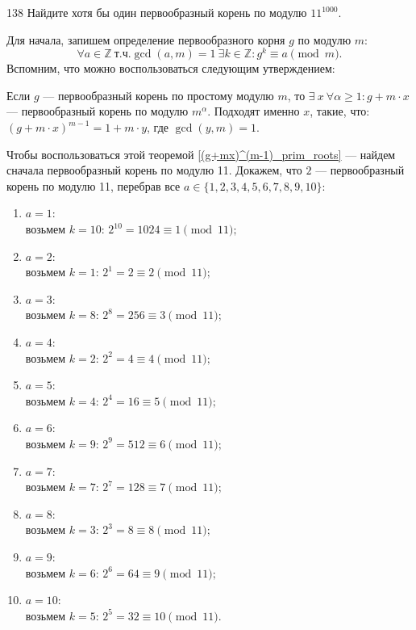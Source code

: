 \begin{task}{138}
Найдите хотя бы один первообразный корень по модулю $11^{1000}$.
\end{task}

\begin{solution}
Для начала, запишем определение первообразного корня $g$ по модулю $m$:
\begin{equation*}
    \forall a \in \mathbb{Z} \ \text{т.ч.} \operatorname{gcd}(a, m) = 1 \ \exists k \in \mathbb{Z} : g^{k} \equiv a \pmod{m}.
\end{equation*}
Вспомним, что можно воспользоваться следующим утверждением:

\begin{theorem} \label{(g+mx)^(m-1)_prim_roots}
Если $g$ --- первообразный корень по простому модулю $m$, то $\exists \ x \ \forall \alpha \geq 1 : g+m\cdot x$ --- первообразный корень по модулю $m^\alpha$. Подходят именно $x$, такие, что: ${\left( g+m\cdot x \right)}^{m - 1} = 1 + m \cdot y$, где $\operatorname{gcd}(y, m) = 1$.
\end{theorem}

Чтобы воспользоваться этой теоремой \ref{(g+mx)^(m-1)_prim_roots} --- найдем сначала первообразный корень по модулю 11. Докажем, что $2$ --- первообразный корень по модулю 11, перебрав все $a \in \{1,2,3,4,5,6,7,8,9,10\}$:
\begin{enumerate}
    \item $a = 1$: \\
    возьмем $k = 10$:  $2^{10} = 1024 \equiv 1 \pmod{11};$
    \item $a = 2$: \\
    возьмем $k = 1$:  $2^1 = 2 \equiv 2 \pmod{11};$
    \item $a = 3$: \\
    возьмем $k = 8$:  $2^8 = 256 \equiv 3 \pmod{11};$
    \item $a = 4$: \\
    возьмем $k = 2$:  $2^2 = 4 \equiv 4 \pmod{11};$
    \item $a = 5$: \\
    возьмем $k = 4$:  $2^4 = 16 \equiv 5 \pmod{11};$
    \item $a = 6$: \\
    возьмем $k = 9$:  $2^9 = 512 \equiv 6 \pmod{11};$
    \item $a = 7$: \\
    возьмем $k = 7$:  $2^7 = 128 \equiv 7 \pmod{11};$
    \item $a = 8$: \\
    возьмем $k = 3$:  $2^3 = 8 \equiv 8 \pmod{11};$
    \item $a = 9$: \\
    возьмем $k = 6$:  $2^6 = 64 \equiv 9 \pmod{11};$
    \item $a = 10$: \\
    возьмем $k = 5$:  $2^5 = 32 \equiv 10 \pmod{11}.$
\end{enumerate}


\end{solution}
